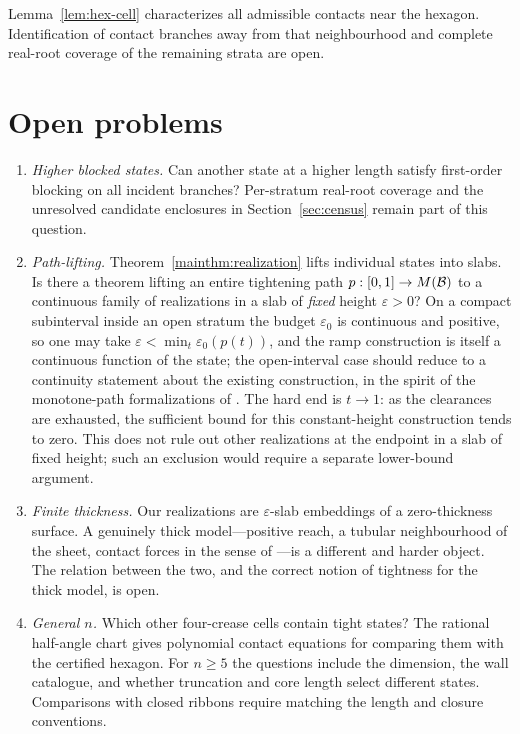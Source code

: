 Lemma~\ref{lem:hex-cell} characterizes all admissible contacts near the hexagon. Identification of contact branches away from that neighbourhood and complete real-root coverage of the remaining strata are open.

\section{Open problems}\label{sec:open}

\begin{enumerate}
\item\label{op:uniqueness}\emph{Higher blocked states.} Can another state at a higher length satisfy first-order blocking on all incident branches? Per-stratum real-root coverage and the unresolved candidate enclosures in Section~\ref{sec:census} remain part of this question.

\item\label{op:lifting}\emph{Path-lifting.} Theorem~\ref{mainthm:realization} lifts individual states into slabs. Is there a theorem lifting an entire tightening path $p:[0,1]\to M(\mathcal{B})$ to a continuous family of realizations in a slab of \emph{fixed} height $\varepsilon>0$? On a compact subinterval inside an open stratum the budget $\varepsilon_0$ is continuous and positive, so one may take $\varepsilon<\min_t\varepsilon_0(p(t))$, and the ramp construction is itself a continuous function of the state; the open-interval case should reduce to a continuity statement about the existing construction, in the spirit of the monotone-path formalizations of \cite{cdr2003}. The hard end is $t\to1$: as the clearances are exhausted, the sufficient bound for this constant-height construction tends to zero. This does not rule out other realizations at the endpoint in a slab of fixed height; such an exclusion would require a separate lower-bound argument.

\item\label{op:thickness}\emph{Finite thickness.} Our realizations are $\varepsilon$-slab embeddings of a zero-thickness surface. A genuinely thick model---positive reach, a tubular neighbourhood of the sheet, contact forces in the sense of \cite{svdm2004,cks2002}---is a different and harder object. The relation between the two, and the correct notion of tightness for the thick model, is open.

\item\label{op:generaln}\emph{General $n$.} Which other four-crease cells contain tight states? The rational half-angle chart gives polynomial contact equations for comparing them with the certified hexagon. For $n\ge5$ the questions include the dimension, the wall catalogue, and whether truncation and core length select different states. Comparisons with closed ribbons \cite{denne2020,chen2025} require matching the length and closure conventions.


\end{enumerate}
